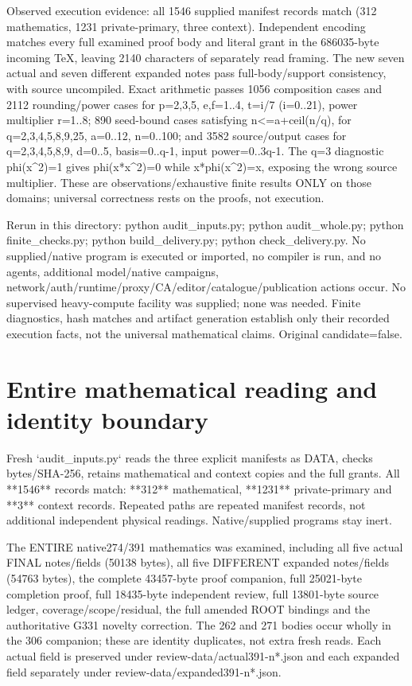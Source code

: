 \documentclass[11pt]{article}
\begin{document}
Observed execution evidence: all 1546 supplied manifest records match (312 mathematics, 1231 private-primary, three context). Independent encoding matches every full examined proof body and literal grant in the 686035-byte incoming TeX, leaving 2140 characters of separately read framing. The new seven actual and seven different expanded notes pass full-body/support consistency, with source uncompiled. Exact arithmetic passes 1056 composition cases and 2112 rounding/power cases for p=2,3,5, e,f=1..4, t=i/7 (i=0..21), power multiplier r=1..8; 890 seed-bound cases satisfying n<=a+ceil(n/q), for q=2,3,4,5,8,9,25, a=0..12, n=0..100; and 3582 source/output cases for q=2,3,4,5,8,9, d=0..5, basis=0..q-1, input power=0..3q-1. The q=3 diagnostic phi(x\textasciicircum{}2)=1 gives phi(x*x\textasciicircum{}2)=0 while x*phi(x\textasciicircum{}2)=x, exposing the wrong source multiplier. These are observations/exhaustive finite results ONLY on those domains; universal correctness rests on the proofs, not execution.

Rerun in this directory: python audit\_inputs.py; python audit\_whole.py; python finite\_checks.py; python build\_delivery.py; python check\_delivery.py. No supplied/native program is executed or imported, no compiler is run, and no agents, additional model/native campaigns, network/auth/runtime/proxy/CA/editor/catalogue/publication actions occur. No supervised heavy-compute facility was supplied; none was needed. Finite diagnostics, hash matches and artifact generation establish only their recorded execution facts, not the universal mathematical claims. Original candidate=false.

\section{Entire mathematical reading and identity boundary}

Fresh `audit\_inputs.py` reads the three explicit manifests as DATA, checks bytes/SHA-256, retains mathematical and context copies and the full grants. All **1546** records match: **312** mathematical, **1231** private-primary and **3** context records. Repeated paths are repeated manifest records, not additional independent physical readings. Native/supplied programs stay inert.

The ENTIRE native274/391 mathematics was examined, including all five actual FINAL notes/fields (50138 bytes), all five DIFFERENT expanded notes/fields (54763 bytes), the complete 43457-byte proof companion, full 25021-byte completion proof, full 18435-byte independent review, full 13801-byte source ledger, coverage/scope/residual, the full amended ROOT bindings and the authoritative G331 novelty correction. The 262 and 271 bodies occur wholly in the 306 companion; these are identity duplicates, not extra fresh reads. Each actual field is preserved under review-data/actual391-n*.json and each expanded field separately under review-data/expanded391-n*.json.
\end{document}
